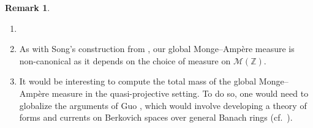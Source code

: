 \documentclass[11pt,reqno]{amsart}
\newcommand{\mZ}{\mathbb{Z}}
\newcommand{\sM}{{\mathscr M}}
\theoremstyle{theorem}
\numberwithin{equation}{subsection}
\numberwithin{equation}{subsection}
\theoremstyle{definition}
\newtheorem{remark}[subsubsection]{Remark}
\theoremstyle{remark}
\numberwithin{equation}{subsubsection} \numberwithin{figure}{section}
\begin{document}
\begin{remark}
\begin{enumerate}
\item[]
\item As with Song's construction from \cite[Section 6]{Song:EquivariantAdelic}, our global Monge--Amp\`ere measure is non-canonical as it depends on the choice of measure on $\sM(\mZ)$. 
\item It would be interesting to compute the total mass of the global Monge--Amp\`ere measure in the quasi-projective setting. To do so, one would need to globalize the arguments of Guo \cite{Guo:Integration}, which would involve developing a theory of forms and currents on Berkovich spaces over general Banach rings (cf.~\cite[Section 0.4.3]{ChambertLoirDucros:FormesDifferentielles}).  
\end{enumerate}
\end{remark}



  {}


 
\end{document}
